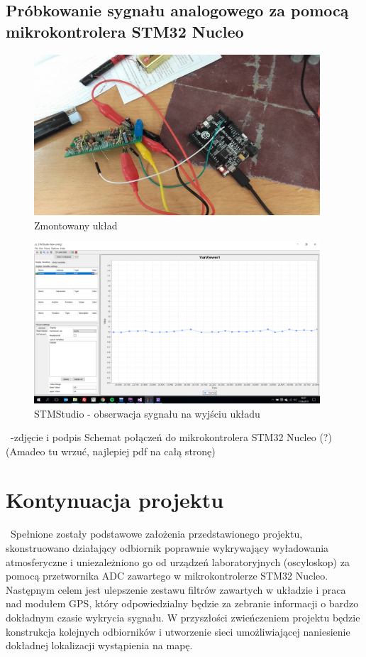 \documentclass[12pt]{article}
\begin{document}
\subsection{Próbkowanie sygnału analogowego za pomocą mikrokontrolera STM32 Nucleo}
\begin{figure}[H]
\begin{center}
\includegraphics[width=0.95\textwidth]{figures/uklad.png}
\caption{Zmontowany układ}
\end{center}
\end{figure}
\begin{figure}[H]
\begin{center}
\includegraphics[width=0.95\textwidth]{figures/stmstudio.png}
\caption{STMStudio - obserwacja sygnału na wyjściu układu}
\end{center}
\end{figure}
\ -zdjęcie i podpis Schemat połączeń do mikrokontrolera STM32 Nucleo (?)\\
(Amadeo tu wrzuć, najlepiej pdf na całą stronę)

\section{Kontynuacja projektu}
\ Spełnione zostały podstawowe założenia przedstawionego projektu, skonstruowano działający odbiornik poprawnie wykrywający wyładowania atmosferyczne i uniezależniono go od urządzeń laboratoryjnych (oscyloskop) za pomocą przetwornika ADC zawartego w mikrokontrolerze STM32 Nucleo. Następnym celem jest ulepszenie zestawu filtrów zawartych w układzie i praca nad modułem GPS, który odpowiedzialny będzie za zebranie informacji o bardzo dokładnym czasie wykrycia sygnału. W przyszłości zwieńczeniem projektu będzie konstrukcja kolejnych odbiorników i utworzenie sieci umożliwiającej naniesienie dokładnej lokalizacji wystąpienia na mapę. 
\end{document}
